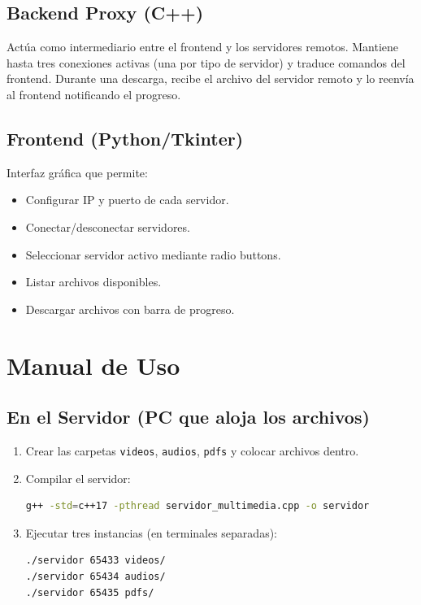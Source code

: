 \documentclass[12pt]{article}
\begin{document}
\subsection{Backend Proxy (C++)}
Actúa como intermediario entre el frontend y los servidores remotos. Mantiene hasta tres conexiones activas (una por tipo de servidor) y traduce comandos del frontend. Durante una descarga, recibe el archivo del servidor remoto y lo reenvía al frontend notificando el progreso.

\subsection{Frontend (Python/Tkinter)}
Interfaz gráfica que permite:
\begin{itemize}
    \item Configurar IP y puerto de cada servidor.
    \item Conectar/desconectar servidores.
    \item Seleccionar servidor activo mediante radio buttons.
    \item Listar archivos disponibles.
    \item Descargar archivos con barra de progreso.
\end{itemize}

\section{Manual de Uso}

\subsection{En el Servidor (PC que aloja los archivos)}
\begin{enumerate}
    \item Crear las carpetas \texttt{videos}, \texttt{audios}, \texttt{pdfs} y colocar archivos dentro.
    \item Compilar el servidor:
    \begin{lstlisting}[language=bash]
g++ -std=c++17 -pthread servidor_multimedia.cpp -o servidor
    \end{lstlisting}
    \item Ejecutar tres instancias (en terminales separadas):
    \begin{lstlisting}[language=bash]
./servidor 65433 videos/
./servidor 65434 audios/
./servidor 65435 pdfs/
    \end{lstlisting}
\end{enumerate}
\end{document}
